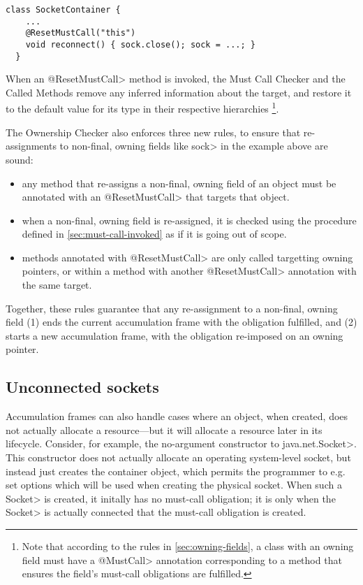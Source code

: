 \begin{lstlisting}[frame=tb,belowskip=3mm]
  class SocketContainer {
    ...
    @ResetMustCall("this")
    void reconnect() { sock.close(); sock = ...; }
  }
\end{lstlisting}

When an \<@ResetMustCall> method is invoked, the Must Call Checker and
the Called Methods remove any inferred information about the target, and
restore it to the default value for its type in their respective hierarchies
\footnote{Note that according to the rules in
  \cref{sec:owning-fields}, a class with an owning field must have a
  \<@MustCall> annotation corresponding to a method that ensures the
  field's must-call obligations are fulfilled.}.

The Ownership Checker also enforces three new rules, to ensure that
re-assignments to non-final, owning fields like \<sock> in the example
above are sound:
\begin{itemize}
\item any method that re-assigns a non-final, owning field of an object
  must be annotated with an \<@ResetMustCall> that targets that object.
\item when a non-final, owning field is re-assigned, it is checked
  using the procedure defined in \cref{sec:must-call-invoked} as if it
  is going out of scope.
\item methods annotated with \<@ResetMustCall> are only called targetting
  owning pointers, or within a method with another \<@ResetMustCall> annotation
  with the same target.
\end{itemize}

\noindent
Together, these rules guarantee that any re-assignment to a non-final, owning
field (1) ends the current accumulation frame with the obligation fulfilled,
and (2) starts a new accumulation frame, with the obligation re-imposed on
an owning pointer.

\subsection{Unconnected sockets}
\label{sec:unconnected-sockets}
Accumulation frames can also handle cases where an object, when created,
does not actually allocate a resource---but it will allocate a resource
later in its lifecycle. Consider, for example, the no-argument constructor
to \<java.net.Socket>. This constructor does not actually allocate an
operating system-level socket, but instead just creates the container
object, which permits the programmer to e.g. set options which will be used
when creating the physical socket. When such a \<Socket> is created, it
initally has no must-call obligation; it is only when the \<Socket> is
actually connected that the must-call obligation is created.

